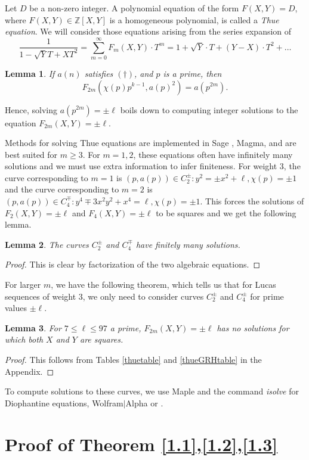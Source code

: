 \documentclass[12pt]{amsart}
\newtheorem{lem}{Lemma}[section]
\newcommand{\Z}{\mathbb{Z}}
\numberwithin{equation}{section}
\begin{document}
Let $D$ be a non-zero integer. A polynomial equation of the form $F(X,Y)=D$, where $F(X,Y)\in \Z[X,Y]$ is a homogeneous polynomial, is called a \textit{Thue equation}. We will consider those equations arising from the series expansion of 
\begin{equation}
\label{Thue}
\frac{1}{1-\sqrt{Y}T+XT^2}=\sum_{m=0}^\infty F_m(X,Y)\cdot T^m=1+\sqrt{Y}\cdot T+(Y-X)\cdot T^2+\dots
\end{equation}
\begin{lem}
 If $a(n)$ satisfies $(\dagger)$, and $p$ is a prime, then
 $$F_{2m}\left(\chi(p)p^{k-1},a(p)^2\right)=a(p^{2m}).$$
\end{lem}
Hence, solving $a(p^{2m})=\pm\ell$ boils down to computing integer solutions to the equation $F_{2m}(X,Y)=\pm\ell$.

Methods for solving Thue equations are implemented in Sage \cite{github}, Magma, and are best suited for $m\geq 3$. For $m=1,2$, these equations often have infinitely many solutions and we must use extra information to infer finiteness. For weight 3, the curve corresponding to $m=1$ is $(p,a(p))\in C^\pm_2:y^2=\pm x^2+\ell,\chi(p)=\pm 1$ and the curve corresponding to $m=2$ is $(p,a(p))\in C^\mp_4:y^4\mp 3x^2y^2+x^4=\ell,\chi(p)=\pm1$. This forces the solutions of $F_2(X,Y)=\pm\ell$ and $F_4(X,Y)=\pm\ell$ to be squares and we get the following lemma.
\begin{lem}
The curves $C^{\pm}_2$ and $C^\mp_4$ have finitely many solutions. 
\end{lem}
\begin{proof}
This is clear by factorization of the two algebraic equations.
\end{proof}

For larger $m$, we have the following theorem, which tells us that for Lucas sequences of weight $3$, we only need to consider curves $C_2^{\pm}$ and $C_4^{\pm}$ for prime values $\pm\ell$.
\begin{lem}{\label{NoThue}}
For $7\leq\ell\leq 97$ a prime, $F_{2m}(X,Y)=\pm\ell$ has no solutions for which both $X$ and $Y$ are squares.
\end{lem}
\begin{proof}
This follows from Tables \ref{thuetable} and \ref{thueGRHtable} in the Appendix. 
\end{proof}


To compute solutions to these curves, we use Maple and the command \textit{isolve} for Diophantine equations, Wolfram$|$Alpha or \cite{OLSolver}.
\section{Proof of Theorem \ref{1.1},\ref{1.2},\ref{1.3}}\label{S3}
\end{document}
